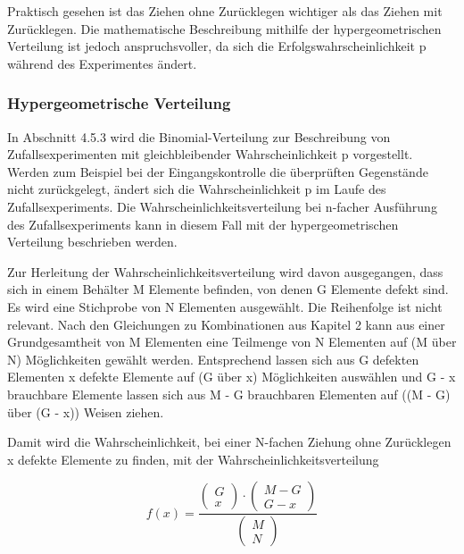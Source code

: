 \noindent Praktisch gesehen ist das Ziehen ohne Zur\"{u}cklegen wichtiger als das Ziehen mit Zur\"{u}cklegen. Die mathematische Beschreibung mithilfe der hypergeometrischen Verteilung ist jedoch anspruchsvoller, da sich die Erfolgswahrscheinlichkeit p w\"{a}hrend des Experimentes \"{a}ndert.

\subsubsection{Hypergeometrische Verteilung}

\noindent In Abschnitt 4.5.3 wird die Binomial-Verteilung zur Beschreibung von Zufallsexperimenten mit gleichbleibender Wahrscheinlichkeit p vorgestellt. Werden zum Beispiel bei der Eingangskontrolle die \"{u}berpr\"{u}ften Gegenst\"{a}nde nicht zur\"{u}ckgelegt, \"{a}ndert sich die Wahrscheinlichkeit p im Laufe des Zufallsexperiments. Die Wahrscheinlichkeitsverteilung bei n-facher Ausf\"{u}hrung des Zufallsexperiments kann in diesem Fall mit der hypergeometrischen Verteilung beschrieben werden.\newline

\noindent Zur Herleitung der Wahrscheinlichkeitsverteilung wird davon ausgegangen, dass sich in einem Beh\"{a}lter M Elemente befinden, von denen G Elemente defekt sind. Es wird eine Stichprobe von N Elementen ausgew\"{a}hlt. Die Reihenfolge ist nicht relevant. Nach den Gleichungen zu Kombinationen aus Kapitel 2 kann aus einer Grundgesamtheit von M Elementen eine Teilmenge von N Elementen auf (M \"{u}ber N) M\"{o}glichkeiten gew\"{a}hlt werden. Entsprechend lassen sich aus G defekten Elementen x defekte Elemente auf (G \"{u}ber x) M\"{o}glichkeiten ausw\"{a}hlen und G - x brauchbare Elemente lassen sich aus M - G brauchbaren Elementen auf ((M - G) \"{u}ber (G - x)) Weisen ziehen.\newline

\noindent Damit wird die Wahrscheinlichkeit, bei einer N-fachen Ziehung ohne Zur\"{u}cklegen x defekte Elemente zu finden, mit der Wahrscheinlichkeitsverteilung 

\begin{equation}\label{eq:fourhundredthirtyeight}
f(x)=\dfrac{\left(\begin{array}{l} {G} \\ 
{x} \end{array}\right)\cdot \left(\begin{array}{l} {M-G} \\ 
{G-x} \end{array}\right)}{\left(\begin{array}{l} {M} \\ 
{N} \end{array}\right)}
\end{equation}

